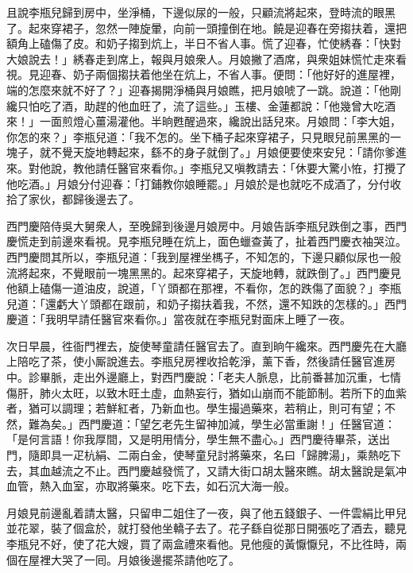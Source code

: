 且說李瓶兒歸到房中，坐淨桶，下邊似尿的一般，只顧流將起來，登時流的眼黑了。起來穿裙子，忽然一陣旋暈，向前一頭撞倒在地。饒是迎春在旁搊扶着，還把額角上磕傷了皮。和奶子搊到炕上，半日不省人事。慌了迎春，忙使綉春：「快對大娘說去！」綉春走到席上，報與月娘衆人。月娘撇了酒席，與衆姐妹慌忙走來看視。見迎春、奶子兩個搊扶着他坐在炕上，不省人事。便問：「他好好的進屋裡，端的怎麼來就不好了？」迎春揭開淨桶與月娘瞧，把月娘唬了一跳。說道：「他剛纔只怕吃了酒，助趕的他血旺了，流了這些。」玉樓、金蓮都說：「他幾曾大吃酒來！」一面煎燈心薑湯灌他。半晌甦醒過來，纔說出話兒來。月娘問：「李大姐，你怎的來？」李瓶兒道：「我不怎的。坐下桶子起來穿裙子，只見眼兒前黑黑的一塊子，就不覺天旋地轉起來，繇不的身子就倒了。」月娘便要使來安兒：「請你爹進來。對他說，教他請任醫官來看你。」李瓶兒又嗔教請去：「休要大驚小恠，打攪了他吃酒。」{}月娘分付迎春：「打鋪教你娘睡罷。」月娘於是也就吃不成酒了，分付收拾了家伙，都歸後邊去了。

西門慶陪侍吳大舅衆人，至晚歸到後邊月娘房中。月娘告訴李瓶兒跌倒之事，西門慶慌走到前邊來看視。見李瓶兒睡在炕上，面色蠟查黃了，扯着西門慶衣袖哭泣。西門慶問其所以，李瓶兒道：「我到屋裡坐榪子，不知怎的，下邊只顧似尿也一般流將起來，不覺眼前一塊黑黑的。起來穿裙子，天旋地轉，就跌倒了。」西門慶見他額上磕傷一道油皮，說道，「丫頭都在那裡，不看你，怎的跌傷了面貌？」李瓶兒道：「還虧大丫頭都在跟前，和奶子搊扶着我，不然，還不知跌的怎樣的。」西門慶道：「我明早請任醫官來看你。」當夜就在李瓶兒對面床上睡了一夜。

次日早晨，徃衙門裡去，旋使琴童請任醫官去了。直到晌午纔來。西門慶先在大廳上陪吃了茶，使小厮說進去。李瓶兒房裡收拾乾淨，薰下香，然後請任醫官進房中。診畢脈，走出外邊廳上，對西門慶說：「老夫人脈息，比前番甚加沉重，{}七情傷肝，肺火太旺，以致木旺土虛，血熱妄行，猶如山崩而不能節制。若所下的血紫者，猶可以調理；若鮮紅者，乃新血也。學生撮過藥來，若稍止，則可有望；不然，難為矣。」{}西門慶道：「望乞老先生留神加減，學生必當重謝！」任醫官道：「是何言語！你我厚間，又是明用情分，學生無不盡心。」西門慶待畢茶，送出門，隨即具一疋杭絹、二兩白金，使琴童兒討將藥來，名曰「歸脾湯」，乘熱吃下去，其血越流之不止。西門慶越發慌了，又請大街口胡太醫來瞧。胡太醫說是氣冲血管，熱入血室，亦取將藥來。吃下去，如石沉大海一般。

月娘見前邊亂着請太醫，只留申二姐住了一夜，與了他五錢銀子、一件雲絹比甲兒並花翠，裝了個盒於，就打發他坐轎子去了。花子繇自從那日開張吃了酒去，聽見李瓶兒不好，使了花大嫂，買了兩盒禮來看他。見他瘦的黃懨懨兒，不比徃時，兩個在屋裡大哭了一囘。{}月娘後邊擺茶請他吃了。


